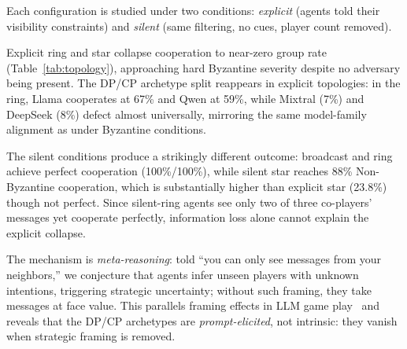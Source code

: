 \documentclass[runningheads]{llncs}
\begin{document}
Each configuration is studied under two conditions: \emph{explicit} (agents told their visibility constraints) and \emph{silent} (same filtering, no cues, player count removed).


Explicit ring and star collapse cooperation to near-zero group rate (Table~\ref{tab:topology}), approaching hard Byzantine severity despite no adversary being present.
The DP/CP archetype split reappears in explicit topologies: in the ring, Llama cooperates at 67\% and Qwen at 59\%, while Mixtral (7\%) and DeepSeek (8\%) defect almost universally, mirroring the same model-family alignment as under Byzantine conditions.

The silent conditions produce a strikingly different outcome: broadcast and ring achieve perfect cooperation (100\%/100\%), while silent star reaches 88\% Non-Byzantine cooperation, which is substantially higher than explicit star (23.8\%) though not perfect.
Since silent-ring agents see only two of three co-players' messages yet cooperate perfectly, information loss alone cannot explain the explicit collapse.

The mechanism is \emph{meta-reasoning}: told ``you can only see messages from your neighbors,'' we conjecture that agents infer unseen players with unknown intentions, triggering strategic uncertainty; without such framing, they take messages at face value.
This parallels framing effects in LLM game play~\cite{montrealethics_framing} and reveals that the DP/CP archetypes are \emph{prompt-elicited}, not intrinsic: they vanish when strategic framing is removed.
\end{document}
